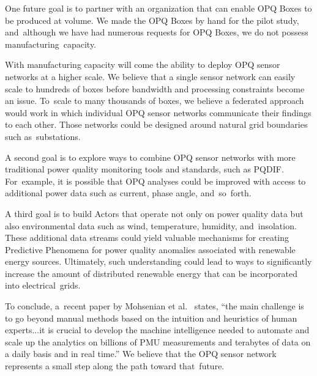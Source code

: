 \documentclass[energies,article,accept,moreauthors,pdftex]{Definitions/mdpi}
\begin{document}
One future goal is to partner with an organization that can enable OPQ Boxes to be produced at volume. We made the OPQ Boxes by hand for the pilot study, and~although we have had numerous requests for OPQ Boxes, we do not possess manufacturing~capacity.

With manufacturing capacity will come the ability to deploy OPQ sensor networks at a higher scale. We believe that a single sensor network can easily scale to hundreds of boxes before bandwidth and processing constraints become an issue. To~scale to many thousands of boxes, we believe a federated approach would work in which individual OPQ sensor networks communicate their findings to each other. Those networks could be designed around natural grid boundaries such as~substations.

A second goal is to explore ways to combine OPQ sensor networks with more traditional power quality monitoring tools and standards, such as PQDIF. For~example, it is possible that OPQ analyses could be improved with access to additional power data such as current, phase angle, and~so~forth.

A third goal is to build Actors that operate not only on power quality data but also environmental data such as wind, temperature, humidity, and~insolation. These additional data streams could yield valuable mechanisms for creating Predictive Phenomena for power quality anomalies associated with renewable energy sources. Ultimately, such understanding could lead to ways to significantly increase the amount of distributed renewable energy that can be incorporated into electrical~grids.

To conclude, a~recent paper by Mohsenian et al.~\cite{mohsenian-rad_distribution_2018} states, “the main challenge is to go beyond manual methods based on the intuition and heuristics of human experts...it is crucial to develop the machine intelligence needed to automate and scale up the analytics on billions of PMU measurements and terabytes of data on a daily basis and in real time.” We believe that the OPQ sensor network represents a small step along the path toward that~future.


\end{document}
